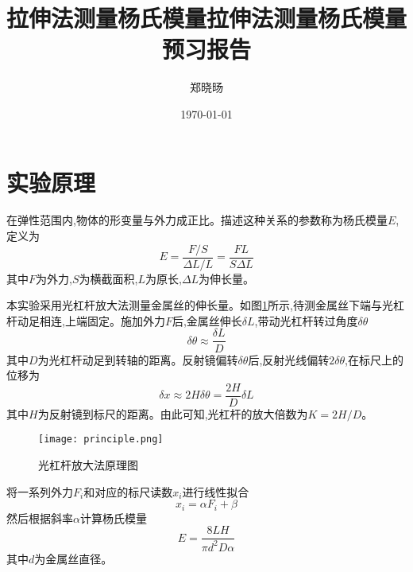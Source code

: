 \documentclass[UTF8]{ctexart}
\title{拉伸法测量杨氏模量}
\title{拉伸法测量杨氏模量预习报告}
\author{郑晓旸}
\date{\today}
\begin{document}
\fancyfoot[C]{\thepage}

\maketitle
\tableofcontents
\newpage
\section{实验原理}

在弹性范围内,物体的形变量与外力成正比。描述这种关系的参数称为杨氏模量$E$,定义为
\begin{equation}
E=\frac{F/S}{\Delta L/L}=\frac{FL}{S\Delta L}
\end{equation}
其中$F$为外力,$S$为横截面积,$L$为原长,$\Delta L$为伸长量。

本实验采用光杠杆放大法测量金属丝的伸长量。如图\ref{fig:principle}所示,待测金属丝下端与光杠杆动足相连,上端固定。施加外力$F$后,金属丝伸长$\delta L$,带动光杠杆转过角度$\delta\theta$
\begin{equation}
\delta\theta\approx\frac{\delta L}{D}
\end{equation}
其中$D$为光杠杆动足到转轴的距离。反射镜偏转$\delta\theta$后,反射光线偏转$2\delta\theta$,在标尺上的位移为
\begin{equation}
\delta x\approx 2H\delta\theta=\frac{2H}{D}\delta L
\end{equation}
其中$H$为反射镜到标尺的距离。由此可知,光杠杆的放大倍数为$K=2H/D$。

\begin{figure}[htbp]
\centering
\texttt{[image: principle.png]}
\caption{光杠杆放大法原理图}
\label{fig:principle}
\end{figure}

将一系列外力$F_i$和对应的标尺读数$x_i$进行线性拟合
\begin{equation}
x_i=\alpha F_i+\beta
\end{equation}
然后根据斜率$\alpha$计算杨氏模量
\begin{equation}
E=\frac{8LH}{\pi d^2D\alpha}
\end{equation}
其中$d$为金属丝直径。
\end{document}
